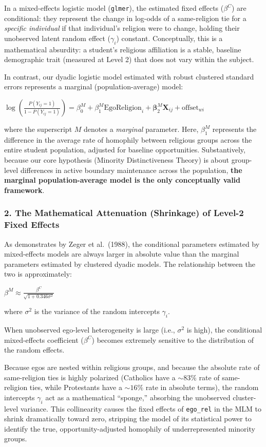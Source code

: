 \documentclass[
  letterpaper,
  DIV=11,
  numbers=noendperiod]{scrartcl}
\begin{document}
In a mixed-effects logistic model (\texttt{glmer}), the estimated fixed
effects (\(\beta^C\)) are conditional: they represent the change in
log-odds of a same-religion tie for a \emph{specific individual} if that
individual's religion were to change, holding their unobserved latent
random effect (\(\gamma_i\)) constant. Conceptually, this is a
mathematical absurdity: a student's religious affiliation is a stable,
baseline demographic trait (measured at Level 2) that does not vary
within the subject.

In contrast, our dyadic logistic model estimated with robust clustered
standard errors represents a marginal (population-average) model:

\(\log\left(\frac{P(Y_{ij} = 1)}{1 - P(Y_{ij} = 1)}\right) = \beta_0^M + \beta_1^M \text{EgoReligion}_i + \mathbf{\beta}_2^M \mathbf{X}_{ij} + \text{offset}_{wi}\)

where the superscript \(M\) denotes a \emph{marginal} parameter. Here,
\(\beta_1^M\) represents the difference in the average rate of homophily
between religious groups across the entire student population, adjusted
for baseline opportunities. Substantively, because our core hypothesis
(Minority Distinctiveness Theory) is about group-level differences in
active boundary maintenance across the population, \textbf{the marginal
population-average model is the only conceptually valid framework}.

\subsubsection{2. The Mathematical Attenuation (Shrinkage) of Level-2
Fixed
Effects}\label{the-mathematical-attenuation-shrinkage-of-level-2-fixed-effects}

As demonstrates by Zeger et al.~(1988), the conditional parameters
estimated by mixed-effects models are always larger in absolute value
than the marginal parameters estimated by clustered dyadic models. The
relationship between the two is approximately:

\(\beta^M \approx \frac{\beta^C}{\sqrt{1 + 0.346 \sigma^2}}\)

where \(\sigma^2\) is the variance of the random intercepts
\(\gamma_i\).

When unobserved ego-level heterogeneity is large (i.e., \(\sigma^2\) is
high), the conditional mixed-effects coefficient (\(\beta^C\)) becomes
extremely sensitive to the distribution of the random effects.

Because egos are nested within religious groups, and because the
absolute rate of same-religion ties is highly polarized (Catholics have
a \(\sim 83\%\) rate of same-religion ties, while Protestants have a
\(\sim 16\%\) rate in absolute terms), the random intercepts
\(\gamma_i\) act as a mathematical ``sponge,'' absorbing the unobserved
cluster-level variance. This collinearity causes the fixed effects of
\texttt{ego\_rel} in the MLM to shrink dramatically toward zero,
stripping the model of its statistical power to identify the true,
opportunity-adjusted homophily of underrepresented minority groups.
\end{document}
